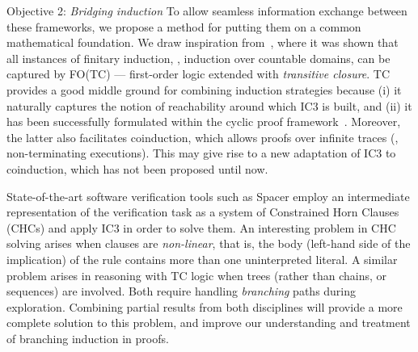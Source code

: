 \begin{paragraph}{Objective 2: {\it Bridging induction}}
To allow seamless information exchange between these frameworks, we propose a method for putting them on a common mathematical foundation.
We draw inspiration from~\cite{Book2003:Avron}, where it was shown that all instances of finitary induction, \ie, induction over countable domains, can be captured by FO(TC) --- first-order logic extended with \emph{transitive closure}.
TC provides a good middle ground for combining induction strategies because
(i) it naturally captures the notion of reachability around which IC3 is built, and
(ii) it has been successfully formulated within the cyclic proof framework~.
Moreover, the latter also facilitates coinduction, which allows proofs over infinite traces (\ie, non-terminating executions).
This may give rise to a new adaptation of IC3 to coinduction, which has not been proposed until now.

State-of-the-art software verification tools such as Spacer employ an intermediate representation of the verification task as a system of Constrained Horn Clauses (CHCs) and apply IC3 in order to solve them.
An interesting problem in CHC solving arises when clauses are \emph{non-linear}, that is, the body (left-hand side of the implication) of the rule contains more than one uninterpreted literal.
A similar problem arises in reasoning with TC logic when trees (rather than chains, or sequences) are involved.
Both require handling \emph{branching} paths during exploration.
Combining partial results from both disciplines will provide a more complete solution to this problem,
and improve our understanding and treatment of branching induction in proofs.


\end{paragraph}


